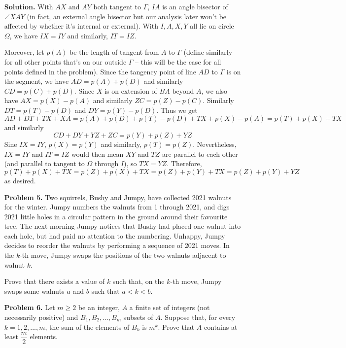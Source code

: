 \documentclass[11pt,a4paper]{article}
\newcommand{\<}{\langle}
\renewcommand{\>}{\rangle}
\begin{document}
\begin{enumerate}
	\textbf{Solution.} With $AX$ and $AY$ both tangent to $\Gamma$, $IA$ is an angle bisector of $\angle XAY$ (in fact, an external angle bisector but our analysis later won't be affected by whether it's internal or external). 
	With $I, A, X, Y$ all lie on circle $\Omega$, we have $IX=IY$ and similarly, $IT=IZ$. 
	
	Moreover, let $p(A)$ be the length of tangent from $A$ to $\Gamma$ (define similarly for all other points that's on our outside $\Gamma$ -- this will be the case for all points defined in the problem). 
	Since the tangency point of line $AD$ to $\Gamma$ is on the segment, we have $AD=p(A)+p(D)$ and similarly $CD=p(C)+p(D)$. 
	Since $X$ is on extension of $BA$ beyond $A$, we also have $AX=p(X)-p(A)$ and similarly $ZC=p(Z)-p(C)$. 
	Similarly $DT=p(T)-p(D)$ and $DY=p(Y)-p(D)$. Thus we get 
	\[
	A D+D T+T X+X A
	=p(A)+p(D)+p(T)-p(D)+TX+p(X)-p(A)=p(T)+p(X)+TX
	\]
	and similarly 
	\[
	C D+D Y+Y Z+Z C
	=p(Y)+p(Z)+YZ
	\]
	Sine $IX=IY$, $p(X)=p(Y)$ and similarly, $p(T)=p(Z)$. Nevertheless, $IX=IY$ and $IT=IZ$ would then mean $XY$ and $TZ$ are parallel to each other (and parallel to tangent to $\Omega$ through $I$), so 
	$TX=YZ$. 
	Therefore, 
	\[
	p(T)+p(X)+TX=p(Z)+p(X)+TX=p(Z)+p(Y)+TX=p(Z)+p(Y)+YZ
	\]
	as desired. 
	
	\item [\textbf{Problem 5.}] Two squirrels, Bushy and Jumpy, have collected 2021 walnuts for the winter. Jumpy numbers the walnuts from 1 through 2021, and digs 2021 little holes in a circular pattern in the ground around their favourite tree. The next morning Jumpy notices that Bushy had placed one walnut into each hole, but had paid no attention to the numbering. Unhappy, Jumpy decides to reorder the walnuts by performing a sequence of 2021 moves. In the $k$-th move, Jumpy swaps the positions of the two walnuts adjacent to walnut $k$.
	
	Prove that there exists a value of $k$ such that, on the $k$-th move, Jumpy swaps some walnuts $a$ and $b$ such that $a<k<b$.
	
	\item [\textbf{Problem 6.}] Let $m\ge 2$ be an integer, $A$ a finite set of integers (not necessarily positive) and $B_1,B_2,...,B_m$ subsets of $A$. Suppose that, for every $k=1,2,...,m$, the sum of the elements of $B_k$ is $m^k$. Prove that $A$ contains at least $\dfrac{m}{2}$ elements.
\end{enumerate}
\end{document}
